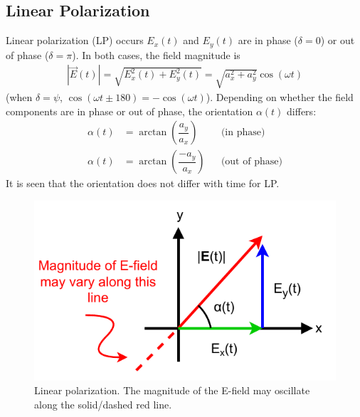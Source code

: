 \subsection{Linear Polarization} 
Linear polarization (LP) occurs $E_x(t)$ and $E_y(t)$ are in phase ($\delta=0$) or out of phase ($\delta=\pi$). In both cases, the field magnitude is
\begin{align}
    |\vec{E}(t)| = \sqrt{E_x^2(t) + E_y^2(t)} = \sqrt{a_x^2 + a_y^2} \cos(\omega t)
\end{align}
(when $\delta=\psi$, $\cos(\omega t \pm 180) = -\cos(\omega t)$). Depending on whether the field components are in phase or out of phase, the orientation $\alpha(t)$ differs: 
\begin{subequations}
\begin{align}
    \alpha(t) &= \arctan\left(\dfrac{a_y}{a_x} \right) && \text{(in phase)} \\ 
    \alpha(t) &= \arctan\left(\dfrac{-a_y}{a_x} \right) && \text{(out of phase)}
\end{align}
\end{subequations}
It is seen that the orientation does not differ with time for LP.

\begin{figure}[!htp]
    \centering
    \includegraphics[width=0.6\linewidth]{images/Plane Wave Propagation/LinearPolarization.pdf}
    \caption{Linear polarization. The magnitude of the E-field may oscillate along the solid/dashed red line.}
    \label{fig:LinearPolarization}
\end{figure}

